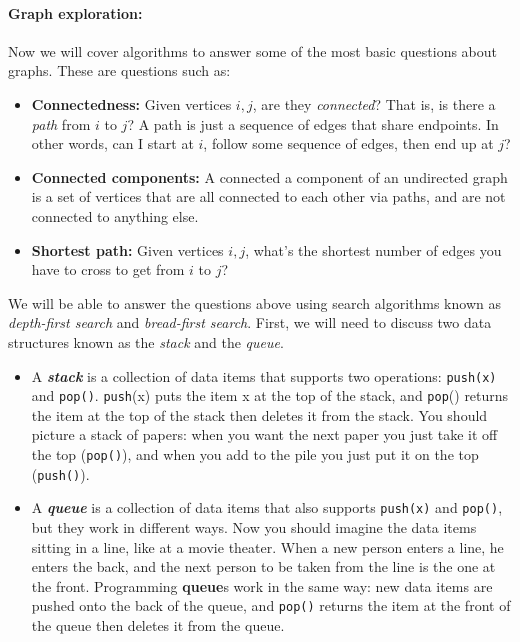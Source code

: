 \documentclass[11pt]{article}
\begin{document}
\paragraph{Graph exploration:}

Now we will cover algorithms to answer some of the most basic questions
about graphs.  These are questions such as:

\begin{itemize}
\item \textbf{Connectedness:} Given vertices $i,j$, are they {\em
    connected}?  That is, is there a {\em
    path} from $i$ to $j$?  A path is just a sequence of edges that
  share endpoints.  In other words, can I start at $i$, follow some
  sequence of edges, then end up at $j$?
\item \textbf{Connected components:} A connected a component of an
  undirected graph is a set of vertices that are all
  connected to each
  other via paths, and are not connected to anything else.
\item \textbf{Shortest path:} Given vertices $i,j$, what's the
  shortest number of edges you have to cross to get from $i$ to $j$?
\end{itemize}

We will be able to answer the questions above using search algorithms
known as {\em depth-first search} and {\em bread-first search}.
First, we will need to discuss two data structures known as the {\em
  stack} and the {\em queue}.

\begin{itemize}
\item A {\em \textbf{stack}} is a collection of data items that supports two
  operations: \texttt{push(x)} and \texttt{pop()}.  \texttt{push}(x)
  puts the item x at the top of the stack, and \texttt{pop}() returns
  the item at the top of the stack then deletes it from the stack.
  You should picture a stack of papers: when you want the next paper
  you just take it off the top (\texttt{pop()}), and when you add to
  the pile you just put it on the top (\texttt{push()}).
\item A {\em \textbf{queue}} is a collection of data items that
  also supports \texttt{push(x)} and \texttt{pop()}, but they work in
  different ways.  Now you should imagine the data items sitting in a
  line, like at a movie theater.  When a new person enters a line, he
  enters the back, and the next person to be taken from the line is
  the one at the front.  Programming \textbf{queue}s work in the same
  way: new data items are pushed onto the back of the queue, and
  \texttt{pop()} returns the item at the front of the queue then
  deletes it from the queue.
\end{itemize}
\end{document}
